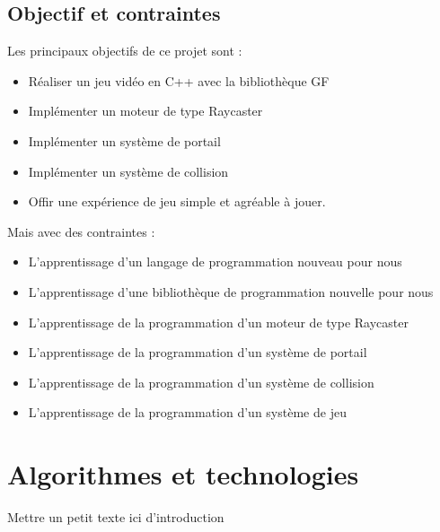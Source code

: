 \documentclass[11pt]{article}
\begin{document}
\subsection{Objectif et contraintes}

Les principaux objectifs de ce projet sont :
\begin{itemize}
	\item Réaliser un jeu vidéo en C++ avec la bibliothèque GF
	\item Implémenter un moteur de type Raycaster
	\item Implémenter un système de portail
	\item Implémenter un système de collision
	\item Offir une expérience de jeu simple et agréable à jouer.
\end{itemize}

Mais avec des contraintes :
\begin{itemize}
	\item L'apprentissage d'un langage de programmation nouveau pour nous
	\item L'apprentissage d'une bibliothèque de programmation nouvelle pour nous
	\item L'apprentissage de la programmation d'un moteur de type Raycaster
	\item L'apprentissage de la programmation d'un système de portail
	\item L'apprentissage de la programmation d'un système de collision
	\item L'apprentissage de la programmation d'un système de jeu
\end{itemize}



\section{Algorithmes et technologies}
Mettre un petit texte ici d'introduction
\end{document}
